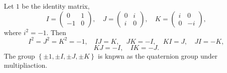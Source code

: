 Let $1$ be the identity matrix,
 \[
	 I=\begin{pmatrix}0&1\\-1&0\end{pmatrix},\quad J=\begin{pmatrix}0&i\\i&0\end{pmatrix},\quad K=\begin{pmatrix}i&0\\0&-i\end{pmatrix}
,\]
where $i^2=-1$. Then
\[
	I^2=J^2=K^2=-1,\quad IJ=K,\quad JK=-I,\quad KI=J,\quad JI=-K,
\]
\[
	KJ=-I,\quad IK=-J
.\]
The group $\left\{ \pm 1, \pm I, \pm J, \pm K \right\} $ is knpwn as the quaternion group under multipliaction.


